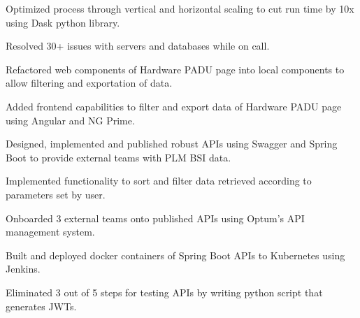 \begin{cventries}
{\begin{cvitems}
        \item {Optimized process through vertical and horizontal scaling to cut run time by 10x using Dask python library.}
        \item {Resolved 30+ issues with servers and databases while on call.}
        \item {Refactored web components of Hardware PADU page into local components to allow filtering and exportation of data.}
        \item {Added frontend capabilities to filter and export data of Hardware PADU page using Angular and NG Prime.}
        \item {Designed, implemented and published robust APIs using Swagger and Spring Boot to provide external teams with PLM BSI data.}
        \item {Implemented functionality to sort and filter data retrieved according to parameters set by user.}
        \item {Onboarded 3 external teams onto published APIs using Optum's API management system.}
        \item {Built and deployed docker containers of Spring Boot APIs to Kubernetes using Jenkins.}
        \item {Eliminated 3 out of 5 steps for testing APIs by writing python script that generates JWTs.}
      \end{cvitems}
    }

\end{cventries}
